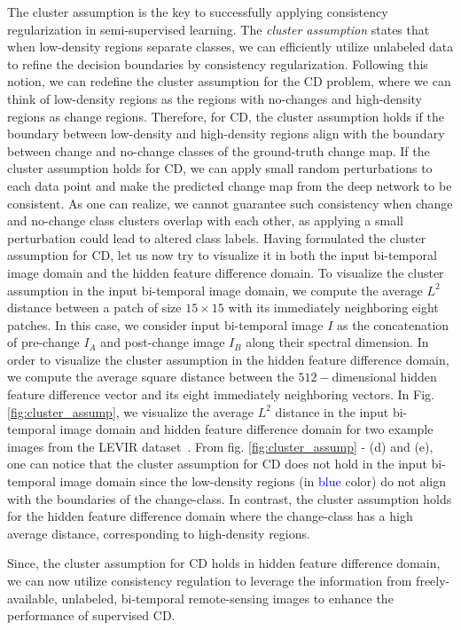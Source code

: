\documentclass[runningheads]{llncs}
\begin{document}
The cluster assumption is the key to successfully applying consistency regularization in semi-supervised learning. The \textit{cluster assumption} states that when low-density regions separate classes, we can efficiently utilize unlabeled data to refine the decision boundaries by consistency regularization. Following this notion, we can redefine the cluster assumption for the CD problem, where we can think of low-density regions as the regions with no-changes and high-density regions as change regions. Therefore, for CD, the cluster assumption holds if the boundary between low-density and high-density regions align with the boundary between change and no-change classes of the ground-truth change map. If the cluster assumption holds for CD, we can apply small random perturbations to each data point and make the predicted change map from the deep network to be consistent. As one can realize, we cannot guarantee such consistency when change and no-change class clusters overlap with each other, as applying a small perturbation could lead to altered class labels. Having formulated the cluster assumption for CD, let us now try to visualize it in both the input bi-temporal image domain and the hidden feature difference domain. To visualize the cluster assumption in the input bi-temporal image domain, we compute the average $L^2$ distance between a patch of size $15 \times 15$ with its immediately neighboring eight patches. In this case, we consider input bi-temporal image $I$ as the concatenation of pre-change $I_A$ and post-change image $I_B$ along their spectral dimension. In order to visualize the cluster assumption in the hidden feature difference domain, we compute the average square distance between the $512-$dimensional hidden feature difference vector and its eight immediately neighboring vectors. In Fig. \ref{fig:cluster_assump}, we visualize the average $L^2$ distance in the input bi-temporal image domain and hidden feature difference domain for two example images from the LEVIR dataset~\cite{levid-cd}. From fig. \ref{fig:cluster_assump} - (d) and (e), one can notice that the cluster assumption for CD does not hold in the input bi-temporal image domain since the low-density regions (in \textcolor{blue}{blue} color) do not align with the boundaries of the change-class. In contrast, the cluster assumption holds for the hidden feature difference domain where the change-class has a high average distance, corresponding to high-density regions.

Since, the cluster assumption for CD holds in hidden feature difference domain, we can now utilize consistency regulation to leverage the information from freely-available, unlabeled, bi-temporal remote-sensing images to enhance the performance of supervised CD.
\vspace{-4mm}
\end{document}
